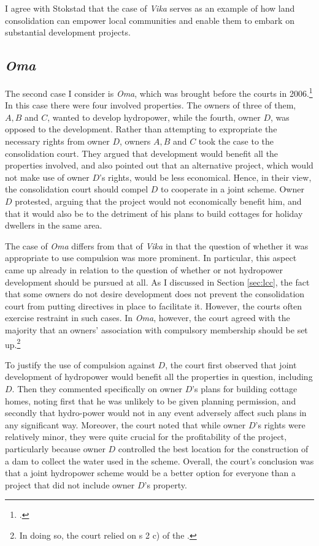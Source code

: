 I agree with Stokstad that the case of \emph{Vika} serves as an example of how land consolidation can empower local communities and enable them to embark on substantial development projects.

\subsection{\emph{Oma}}

The second case I consider is \emph{Oma}, which was brought before the courts in 2006.\footcite{oma06} In this case there were four involved properties. The owners of three of them, $A,B$ and $C$, wanted to develop hydropower, while the fourth, owner $D$, was opposed to the development. Rather than attempting to expropriate the necessary rights from owner $D$, owners $A,B$ and $C$ took the case to the consolidation court. They argued that development would benefit all the properties involved, and also pointed out that an alternative project, which would not make use of owner $D$'s rights, would be less economical. Hence, in their view, the consolidation court should compel $D$ to cooperate in a joint scheme. Owner $D$ protested, arguing that the project would not economically benefit him, and that it would also be to the detriment of his plans to build cottages for holiday dwellers in the same area.

The case of \emph{Oma} differs from that of \emph{Vika} in that the question of whether it was appropriate to use compulsion was more prominent. In particular, this aspect came up already in relation to the question of whether or not hydropower development should be pursued at all. As I discussed in Section \ref{sec:lcc}, the fact that some owners do not desire development does not prevent the consolidation court from putting directives in place to facilitate it. However, the courts often exercise restraint in such cases. In \emph{Oma}, however, the court agreed with the majority  that an owners' association with compulsory membership should be set up.\footnote{In doing so, the court relied on s 2 c) of the \cite{lca79}.}

To justify the use of compulsion against $D$, the court first observed that joint development of hydropower would benefit all the properties in question, including $D$. Then they commented specifically on owner $D$'s plans for building cottage homes, noting first that he was unlikely to be given planning permission, and secondly that hydro-power would not in any event adversely affect such plans in any significant way. Moreover, the court noted that while owner $D$'s rights were relatively minor, they were quite crucial for the profitability of the project, particularly because owner $D$ controlled the best location for the construction of a dam to collect the water used in the scheme. Overall, the court's conclusion was that a joint hydropower scheme would be a better option for everyone than a project that did not include owner $D$'s property.

